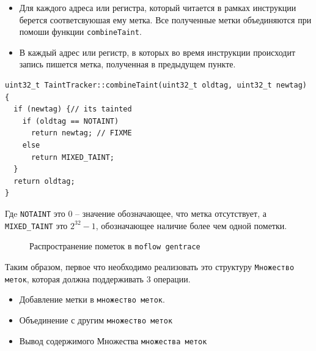\begin{itemize}
    \item Для каждого адреса или регистра, который читается в рамках инструкции берется соответсвуюшая ему метка. Все полученные метки объединяются при помоши функции \texttt{combineTaint}.
    \item В каждый адрес или регистр, в которых во время инструкции происходит запись пишется метка, полученная в предыдущем пункте.
\end{itemize}

\begin{lstlisting}[environoment=cpp_code,captionpos=b]
uint32_t TaintTracker::combineTaint(uint32_t oldtag, uint32_t newtag)
{
  if (newtag) {// its tainted
    if (oldtag == NOTAINT)
      return newtag; // FIXME
    else 
      return MIXED_TAINT;
  }
  return oldtag;
}
\end{lstlisting}

Гдe \texttt{NOTAINT} это $0$ -- значение обозначающее, что метка отсутствует, а \texttt{MIXED\_TAINT} это $2^{32}-1$, обозначающее наличие более чем одной пометки.

\begin{figure}[H]
    \caption{Распространение пометок в \texttt{moflow gentrace}}
    \label{fig:moflow2}
\end{figure}

Таким образом, первое что необходимо реализовать это структуру \texttt{Множество меток}, которая должна поддерживать $3$ операции.

\begin{itemize}
    \item Добавление метки в \texttt{множество меток}.
    \item Объединение с другим \texttt{множество меток}
    \item Вывод содержимого Множества \texttt{множества меток}
\end{itemize}

